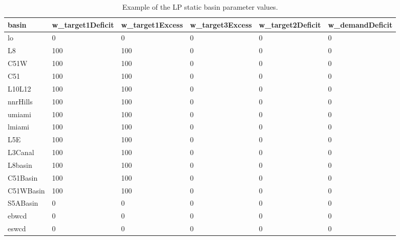 \begin{table}[!htb]
 \begin{center}
  \footnotesize
  \caption{Example of the LP static basin parameter values. }\label{StaticbasinPara}
  \begin{tabular}{p{2.5cm}p{2.2cm}p{2.2cm}p{2.2cm}p{2.2cm}p{2.2cm}}                  \\[0.8ex]
   basin          &w\_target1Deficit &w\_target1Excess  &w\_target3Excess &w\_target2Deficit &w\_demandDeficit \\
  \hline 
  lo              &   0         &    0          &    0         &     0         &    0 \\
  L8              & 100         &  100          &    0         &     0         &    0 \\
  C51W            & 100         &  100          &    0         &     0         &    0 \\
  C51             & 100         &  100          &    0         &     0         &    0 \\
  L10L12          & 100         &  100          &    0         &     0         &    0 \\
  nnrHills        & 100         &  100          &    0         &     0         &    0 \\
  umiami          & 100         &  100          &    0         &     0         &    0 \\
  lmiami          & 100         &  100          &    0         &     0         &    0 \\
  L5E             & 100         &  100          &    0         &     0         &    0 \\
  L3Canal         & 100         &  100          &    0         &     0         &    0 \\
  L8basin         & 100         &  100          &    0         &     0         &    0 \\
  C51Basin        & 100         &  100          &    0         &     0         &    0 \\
  C51WBasin       & 100         &  100          &    0         &     0         &    0 \\
  S5ABasin        &   0         &    0          &    0         &     0         &    0 \\
  ebwcd           &   0         &    0          &    0         &     0         &    0 \\
  eswcd           &   0         &    0          &    0         &     0         &    0 \\

\end{tabular}
\end{center}
\end{table}

